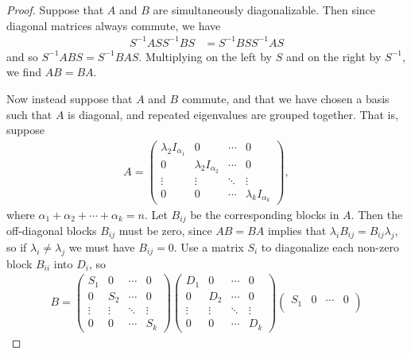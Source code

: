 \begin{proof}
    Suppose that $A$ and $B$ are simultaneously diagonalizable. Then since diagonal matrices always commute, we have
    \begin{align*}
        S^{-1}ASS^{-1}BS &= S^{-1}BSS^{-1}AS
    \end{align*}
    and so $S^{-1}ABS = S^{-1}BAS$. Multiplying on the left by $S$ and on the right by $S^{-1}$, we find $AB = BA$.

    Now instead suppose that $A$ and $B$ commute, and that we have chosen a basis such that $A$ is diagonal, and repeated eigenvalues are grouped together. That is, suppose
    \begin{align*}
        A = \begin{pmatrix}
            \lambda_2 I_{\alpha_1} & 0 & \cdots & 0 \\
            0 & \lambda_2 I_{\alpha_2} & \cdots & 0 \\
            \vdots & \vdots & \ddots & \vdots \\
            0 & 0 & \cdots & \lambda_k I_{\alpha_k}
        \end{pmatrix},
    \end{align*}
    where $\alpha_1 + \alpha_2 + \cdots + \alpha_k = n$. Let $B_{ij}$ be the corresponding blocks in $A$. Then the off-diagonal blocks $B_{ij}$ must be zero, since $AB = BA$ implies that $\lambda_{i}B_{ij} = B_{ij}\lambda_{j}$, so if $\lambda_i \neq \lambda_j$ we must have $B_{ij} = 0$. Use a matrix $S_i$ to diagonalize each non-zero block $B_{ii}$ into $D_{i}$, so
    \begin{align*}
        B = \begin{pmatrix}
            S_{1} & 0 & \cdots & 0 \\
            0 & S_{2} & \cdots & 0 \\
            \vdots & \vdots & \ddots & \vdots \\
            0 & 0 & \cdots & S_{k}
        \end{pmatrix}\begin{pmatrix}
            D_{1} & 0 & \cdots & 0 \\
            0 & D_{2} & \cdots & 0 \\
            \vdots & \vdots & \ddots & \vdots \\
            0 & 0 & \cdots & D_{k}
        \end{pmatrix}\begin{pmatrix}
            S_{1} & 0 & \cdots & 0 \\

\end{pmatrix}
\end{align*}
\end{proof}

